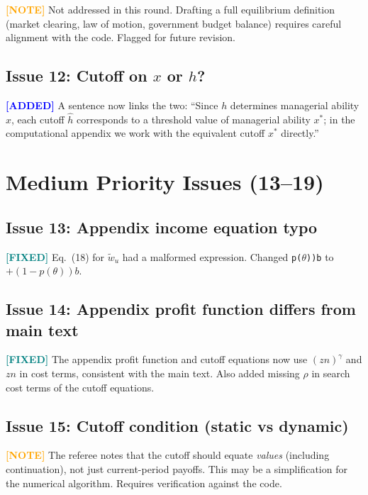 \documentclass[11pt]{article}
\newcommand{\fixed}{\textcolor{teal}{\textbf{[FIXED]}}}
\newcommand{\added}{\textcolor{blue}{\textbf{[ADDED]}}}
\newcommand{\noted}{\textcolor{orange}{\textbf{[NOTE]}}}
\begin{document}
\noted{} Not addressed in this round. Drafting a full equilibrium definition (market clearing, law of motion, government budget balance) requires careful alignment with the code. Flagged for future revision.

\subsection*{Issue 12: Cutoff on $x$ or $h$?}

\added{} A sentence now links the two: ``Since $h$ determines managerial ability $x$, each cutoff $\hat{h}$ corresponds to a threshold value of managerial ability $x^*$; in the computational appendix we work with the equivalent cutoff $x^*$ directly.''

\section*{Medium Priority Issues (13--19)}

\subsection*{Issue 13: Appendix income equation typo}

\fixed{} Eq.~(18) for $\widetilde{w}_u$ had a malformed expression. Changed \texttt{p($\theta$))b} to $+(1-p(\theta))b$.

\subsection*{Issue 14: Appendix profit function differs from main text}

\fixed{} The appendix profit function and cutoff equations now use $(zn)^\gamma$ and $zn$ in cost terms, consistent with the main text. Also added missing $\rho$ in search cost terms of the cutoff equations.

\subsection*{Issue 15: Cutoff condition (static vs dynamic)}

\noted{} The referee notes that the cutoff should equate \emph{values} (including continuation), not just current-period payoffs. This may be a simplification for the numerical algorithm. Requires verification against the code.
\end{document}
